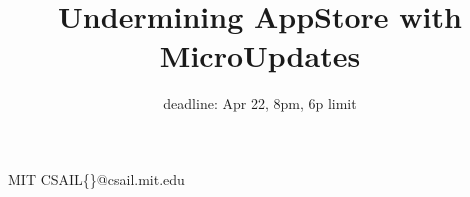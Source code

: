 \documentclass[preprint,nocopyrightspace,11pt]{sigplanconf}
\begin{document}


\title{Undermining AppStore with MicroUpdates}
\subtitle{deadline: Apr 22, 8pm, 6p limit}

           {MIT CSAIL}{\{\}@csail.mit.edu}

\maketitle












\begin{small}
%  

\end{small}
\end{document}
